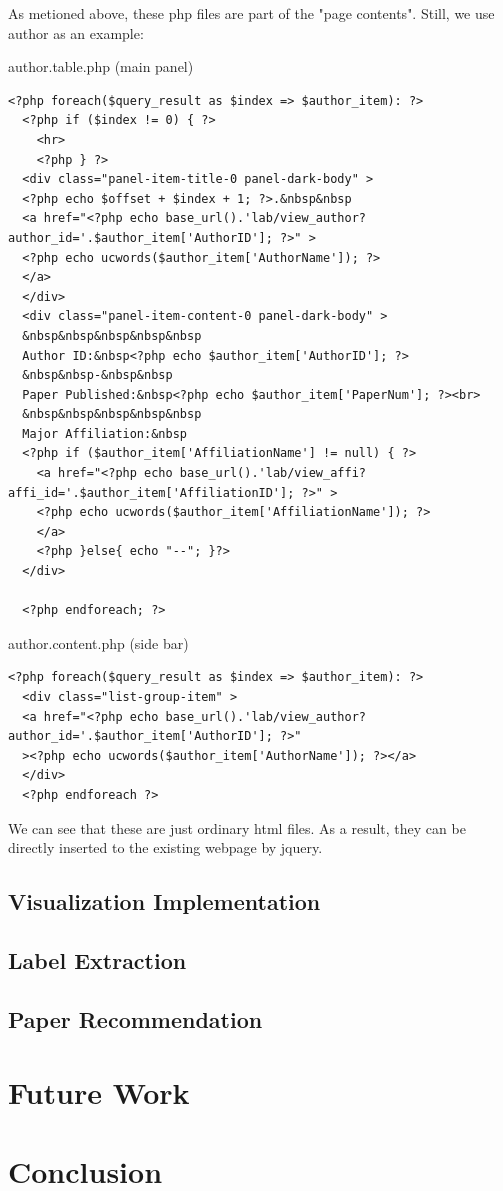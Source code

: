 \documentclass[a4paper, 10pt]{article}
\begin{document}
As metioned above, these php files are part of the "page contents". Still, we use author as an example:

author.table.php (main panel)
\begin{lstlisting}[language=php+html]
  <?php foreach($query_result as $index => $author_item): ?>
  <?php if ($index != 0) { ?>
    <hr>
    <?php } ?>
  <div class="panel-item-title-0 panel-dark-body" >
  <?php echo $offset + $index + 1; ?>.&nbsp&nbsp
  <a href="<?php echo base_url().'lab/view_author?author_id='.$author_item['AuthorID']; ?>" >
  <?php echo ucwords($author_item['AuthorName']); ?>
  </a>
  </div>
  <div class="panel-item-content-0 panel-dark-body" >
  &nbsp&nbsp&nbsp&nbsp&nbsp
  Author ID:&nbsp<?php echo $author_item['AuthorID']; ?>
  &nbsp&nbsp-&nbsp&nbsp
  Paper Published:&nbsp<?php echo $author_item['PaperNum']; ?><br>
  &nbsp&nbsp&nbsp&nbsp&nbsp
  Major Affiliation:&nbsp
  <?php if ($author_item['AffiliationName'] != null) { ?>
    <a href="<?php echo base_url().'lab/view_affi?affi_id='.$author_item['AffiliationID']; ?>" >
    <?php echo ucwords($author_item['AffiliationName']); ?>
    </a>
    <?php }else{ echo "--"; }?>
  </div>

  <?php endforeach; ?>
\end{lstlisting}

author.content.php (side bar)
\begin{lstlisting}[language=php+html]
  <?php foreach($query_result as $index => $author_item): ?>
  <div class="list-group-item" >
  <a href="<?php echo base_url().'lab/view_author?author_id='.$author_item['AuthorID']; ?>"
  ><?php echo ucwords($author_item['AuthorName']); ?></a>
  </div>
  <?php endforeach ?>
\end{lstlisting}

We can see that these are just ordinary html files. As a result, they can be directly inserted to the existing webpage by jquery.

\subsection{Visualization Implementation}
\subsection{Label Extraction}
\subsection{Paper Recommendation}
\section{Future Work}
\section{Conclusion}

\newpage
\begin{appendices}
\end{appendices}
\end{document}
